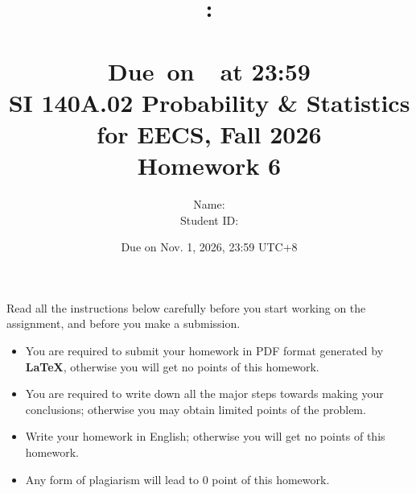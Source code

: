 \documentclass[a4paper]{article}
\title{
    \vspace{2in}
    \textmd{\textbf{\hmwkClass:\\  \hmwkTitle}}\\
    \normalsize\vspace{0.1in}\small{Due\ on\ \hmwkDueDate\ at 23:59}\\
	\vspace{4in}
}
\author{
	Name: \textbf{\hmwkAuthorName} \\
	Student ID: \hmwkAuthorID}
\date{}
\begin{document}

\date{
Due on Nov. 1, 2026, 23:59 UTC+8}
\title{SI 140A.02  Probability \& Statistics for EECS, Fall 2026 \\
Homework 6}
\maketitle
Read all the instructions below carefully before you start working on the assignment, and before you make a submission.
\begin{itemize}
    \item You are required to submit your homework in PDF format generated by \textbf{LaTeX}, otherwise you will get no points of this homework.
    \item You are required to write down all the major steps towards making your conclusions; otherwise you may obtain limited points of the problem.
    \item Write your homework in English; otherwise you will get no points of this homework.
    \item Any form of plagiarism will lead to $0$ point of this homework. 
\end{itemize}
\newpage
\end{document}
